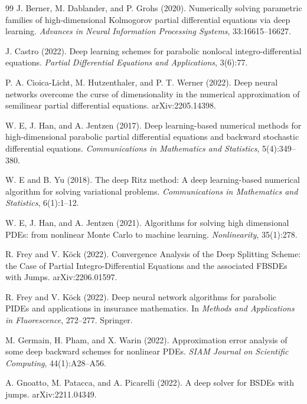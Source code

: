 \documentclass[11pt]{article}
\theoremstyle{definition}
\theoremstyle{plain}
\begin{document}
\begin{appendices}
\begin{thebibliography}{99}
 J. Berner, M. Dablander, and P. Grohs (2020). \newblock Numerically solving parametric families of high-dimensional Kolmogorov partial differential equations via deep learning. \newblock \emph{Advances in Neural Information Processing Systems}, 33:16615--16627.

 J. Castro (2022). \newblock Deep learning schemes for parabolic nonlocal integro-differential equations. \newblock \emph{Partial Differential Equations and Applications}, 3(6):77.

 P. A. Cioica-Licht, M. Hutzenthaler, and P. T. Werner (2022). \newblock Deep neural networks overcome the curse of dimensionality in the numerical approximation of semilinear partial differential equations. \newblock arXiv:2205.14398.

 W. E, J. Han, and A. Jentzen (2017). \newblock Deep learning-based numerical methods for high-dimensional parabolic partial differential equations and backward stochastic differential equations. \newblock \emph{Communications in Mathematics and Statistics}, 5(4):349--380.

 W. E and B. Yu (2018). \newblock The deep Ritz method: A deep learning-based numerical algorithm for solving variational problems. \newblock \emph{Communications in Mathematics and Statistics}, 6(1):1--12.

 W. E, J. Han, and A. Jentzen (2021). \newblock Algorithms for solving high dimensional PDEs: from nonlinear Monte Carlo to machine learning. \newblock \emph{Nonlinearity}, 35(1):278.

 R. Frey and V. Köck (2022). \newblock Convergence Analysis of the Deep Splitting Scheme: the Case of Partial Integro-Differential Equations and the associated FBSDEs with Jumps. \newblock arXiv:2206.01597.

 R. Frey and V. Köck (2022). \newblock Deep neural network algorithms for parabolic PIDEs and applications in insurance mathematics. \newblock In \emph{Methods and Applications in Fluorescence}, 272--277. Springer.

 M. Germain, H. Pham, and X. Warin (2022). \newblock Approximation error analysis of some deep backward schemes for nonlinear PDEs. \newblock \emph{SIAM Journal on Scientific Computing}, 44(1):A28--A56.

 A. Gnoatto, M. Patacca, and A. Picarelli (2022). \newblock A deep solver for BSDEs with jumps. \newblock arXiv:2211.04349.


\end{thebibliography}
\end{appendices}
\end{document}
